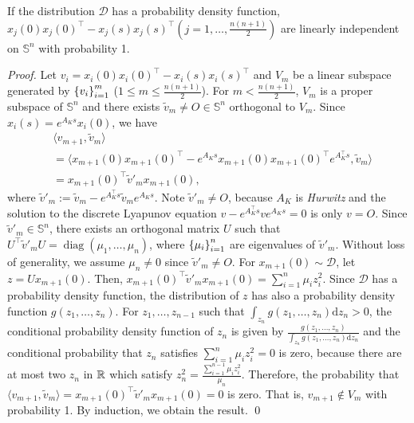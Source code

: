 \begin{theorem}
If the distribution $\mathcal {D}$ has a probability density function, $x_j(0)x_j(0)^\top - x_j(s)x_j(s)^\top(j=1, \dots, \frac{n(n+1)}{2})$ are linearly independent on $\mathbb{S}^n$ with probability 1.
\end{theorem}
\begin{proof}
Let $v_i = x_i(0)x_i(0)^\top - x_i(s)x_i(s)^\top$ and $V_m$ be a linear subspace generated by $\qty{v_i}_{i=1}^m$ ($1 \leq m \leq \frac{n(n+1)}{2}$).
For $m < \frac{n(n+1)}{2}$, $V_m$ is a proper subspace of $\mathbb{S}^n$ and there exists $\tilde v_m \neq O \in \mathbb{S}^n$ orthogonal to $V_m$.
Since $x_i(s) = e^{A_Ks}x_i(0)$, we have
\begin{align}
    &\langle v_{m+1}, \tilde v_m\rangle\\
    &= \langle x_{m+1}(0)x_{m+1}(0)^\top - e^{A_Ks}x_{m+1}(0)x_{m+1}(0)^\top e^{A_K^\top s}, \tilde v_m\rangle\\
    &= x_{m+1}(0)^\top \tilde v'_m x_{m+1}(0),
\end{align}
    where $\tilde v'_m := \tilde v_{m} - e^{A^\top_Ks}\tilde v_{m}e^{A_Ks}$.
    Note $\tilde v'_m \neq O$, because $A_K$ is \textit{Hurwitz} and the solution to the discrete Lyapunov equation $v - e^{A^\top_Ks} v e^{A_Ks} = 0$ is only $v = O$. Since $\tilde v'_m \in \mathbb{S}^n$, there exists an orthogonal matrix $U$ such that $U^\top \tilde v'_m U = \operatorname{diag}(\mu_1, \dots, \mu_n)$, where $\qty{\mu_i}_{i=1}^n$ are eigenvalues of $\tilde v'_m$. Without loss of generality, we assume $\mu_n \neq 0$ since $\tilde v'_m \neq O$. For $x_{m+1}(0) \sim \mathcal {D}$, let $z = Ux_{m+1}(0)$. Then, $x_{m+1}(0)^\top \tilde v'_m x_{m+1}(0) = \sum_{i=1}^n \mu_i z_i^2$. Since $\mathcal{D}$ has a probability density function, the distribution of $z$ has also a probability density function $g(z_1, \dots, z_n)$. For $z_1, \dots, z_{n-1}$ such that $\int_{z_n} g(z_1, \dots, z_{n})\mathrm{d}z_n > 0$, the conditional probability density function of $z_n$ is given by $\frac{g(z_1, \dots, z_n)}{\int_{z_n} g(z_1, \dots, z_{n})\mathrm{d}z_n}$ and the conditional probability that $z_n$ satisfies $\sum_{i=1}^n \mu_i z_i^2 = 0$ is zero, because there are at most two $z_n$ in $\mathbb{R}$ which satisfy $z_n^2 = \frac{\sum_{i=1}^{n-1} \mu_i z_i^2}{\mu_n}$. 
    Therefore, the probability that $\langle v_{m+1}, \tilde v_m\rangle = x_{m+1}(0)^\top \tilde v'_m x_{m+1}(0) = 0$ is zero.
    That is,
    $v_{m+1} \notin V_m$ with probability 1. 
    By induction, we obtain the result. \qed
\end{proof}
% 